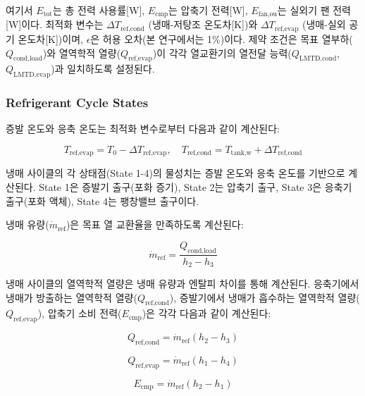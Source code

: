 \documentclass[final,5p,times,twocolumn,authoryear]{elsarticle}
\begin{document}
여기서 $E_{\text{tot}}$는 총 전력 사용률[W], $E_{\text{cmp}}$는 압축기 전력[W], $E_{\text{fan,ou}}$는 실외기 팬 전력[W]이다. 최적화 변수는 $\Delta T_{\text{ref,cond}}$ (냉매-저탕조 온도차[K])와 $\Delta T_{\text{ref,evap}}$ (냉매-실외 공기 온도차[K])이며, $\epsilon$은 허용 오차(본 연구에서는 1\%)이다. 제약 조건은 목표 열부하($Q_{\text{cond,load}}$)와 열역학적 열량($Q_{\text{ref,evap}}$)이 각각 열교환기의 열전달 능력($Q_{\text{LMTD,cond}}$, $Q_{\text{LMTD,evap}}$)과 일치하도록 설정된다.

\subsubsection{Refrigerant Cycle States}

증발 온도와 응축 온도는 최적화 변수로부터 다음과 같이 계산된다:

\begin{equation}
\label{eq:hpb_temperatures}
T_{\text{ref,evap}} = T_0 - \Delta T_{\text{ref,evap}}, \quad T_{\text{ref,cond}} = T_{\text{tank,w}} + \Delta T_{\text{ref,cond}}
\end{equation}

냉매 사이클의 각 상태점(State 1-4)의 물성치는 증발 온도와 응축 온도를 기반으로 계산된다. State 1은 증발기 출구(포화 증기), State 2는 압축기 출구, State 3은 응축기 출구(포화 액체), State 4는 팽창밸브 출구이다.

냉매 유량($\dot{m}_{\text{ref}}$)은 목표 열 교환율을 만족하도록 계산된다:

\begin{equation}
\label{eq:hpb_refrigerant_flow}
\dot{m}_{\text{ref}} = \frac{Q_{\text{cond,load}}}{h_2 - h_3}
\end{equation}

냉매 사이클의 열역학적 열량은 냉매 유량과 엔탈피 차이를 통해 계산된다. 응축기에서 냉매가 방출하는 열역학적 열량($Q_{\text{ref,cond}}$), 증발기에서 냉매가 흡수하는 열역학적 열량($Q_{\text{ref,evap}}$), 압축기 소비 전력($E_{\text{cmp}}$)은 각각 다음과 같이 계산된다:

\begin{equation}
\label{eq:hpb_q_ref_cond}
Q_{\text{ref,cond}} = \dot{m}_{\text{ref}} (h_2 - h_3)
\end{equation}

\begin{equation}
\label{eq:hpb_q_ref_evap}
Q_{\text{ref,evap}} = \dot{m}_{\text{ref}} (h_1 - h_4)
\end{equation}

\begin{equation}
\label{eq:hpb_e_cmp}
E_{\text{cmp}} = \dot{m}_{\text{ref}} (h_2 - h_1)
\end{equation}
\end{document}
